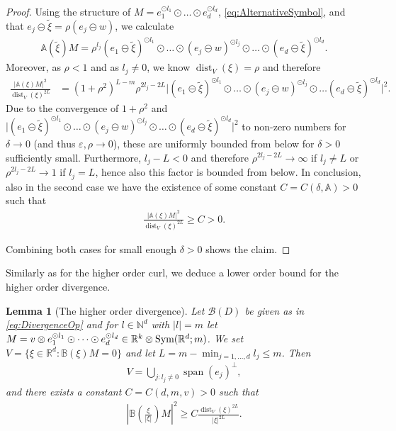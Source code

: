 \documentclass[a4paper, 10pt, twoside, notitlepage]{amsart}
\theoremstyle{plain}
\newtheorem{lem}[prop]{Lemma}
\newcommand{\R}{\mathbb{R}}
\newcommand{\N}{\mathbb{N}}
\renewcommand{\AA}{\mathbb{A}}
\renewcommand{\S}[1]{\textup{Sym}(\R^d;#1)}
\DeclareMathOperator{\dist}{dist}
\DeclareMathOperator{\vspan}{span}
\begin{document}
\begin{proof}
					Using the structure of $M = e_1^{\odot l_1} \odot \dots \odot e_d^{\odot l_d}$, \cref{eq:AlternativeSymbol}, and that $e_j \circleddash \tilde{\xi} = \rho (e_j \circleddash w)$, we calculate
					\begin{align*}
						\AA(\tilde{\xi})M = \rho^{l_j} (e_1 \circleddash \tilde{\xi})^{\odot l_1} \odot \dots \odot (e_j \circleddash w)^{\odot l_j} \odot \dots \odot (e_d \circleddash \tilde{\xi})^{\odot l_d}.
					\end{align*}
					Moreover, as $\rho < 1$ and as $l_j \neq 0$, we know $\dist_V(\xi) = \rho$ and therefore
					\begin{align} \label{eq:OptimalL_A}
						\frac{\Big|\AA(\xi)M\Big|^2}{\dist_V(\xi)^{2L}} & = (1+\rho^2)^{L-m} \rho^{2l_j - 2L} \Big| (e_1 \circleddash \tilde{\xi})^{\odot l_1} \odot \dots \odot (e_j \circleddash w)^{\odot l_j} \odot \dots (e_d \circleddash \tilde{\xi})^{\odot l_d} \Big|^2.
					\end{align}
					Due to the convergence of $1+\rho^2$ and
					$\Big| (e_1 \circleddash \tilde{\xi})^{\odot l_1} \odot \dots \odot (e_j \circleddash w)^{\odot l_j} \odot \dots \odot (e_d \circleddash \tilde{\xi})^{\odot l_d} \Big|^2$ to non-zero numbers
					for $\delta \to 0$ (and thus $\varepsilon, \rho \to 0$), these are uniformly bounded from below for $\delta > 0$ sufficiently small.  Furthermore, $l_j - L < 0$ and therefore
					$\rho^{2l_j - 2L} \to \infty$ if $l_j \neq L$ or $\rho^{2l_j - 2L} \to 1$ if $l_j = L$, hence also this factor is bounded from below.  In conclusion, also in the second case
					we have the existence of some constant $C = C(\delta,\AA) > 0$ such that
					\begin{align*}
						\frac{\Big|\AA(\xi)M \Big|^2}{\dist_V(\xi)^{2L}} \geq C > 0.
					\end{align*}
					
				Combining both cases for small enough $\delta>0$ shows the claim.  
\end{proof}			
			
		
		
		Similarly as for the higher order curl, we deduce a lower order bound for the higher order divergence.
		
		\begin{lem}[The higher order divergence]
			\label{lem:LowerBoundMultipl_div}
			Let $\mathcal{B}(D)$ be given as in \cref{eq:DivergenceOp} and for $l \in \N^d$ with $|l| = m$ let $M = v \otimes e_1^{\odot l_1} \odot \dots \odot e_d^{\odot l_d} \in \R^k \otimes \S{m}$.  We set
				$V = \{\xi \in \R^d: \mathbb{B}(\xi)M = 0\}$ and let $L = m - \min_{j=1,\dots,d} l_j \leq m$.  Then
\begin{align*}
V = \bigcup_{j: l_j \neq 0} \vspan(e_j)^\perp,
\end{align*}				
			and	 there exists a constant $C=C(d,m,v)>0$ such
			that
			\begin{align*}
                          |\mathbb{B}(\frac{\xi}{|\xi|})M|^2 \geq C \frac{\dist_V(\xi)^{2L}}{|\xi|^{2L}}.
			\end{align*}
		\end{lem}
		
\end{document}
